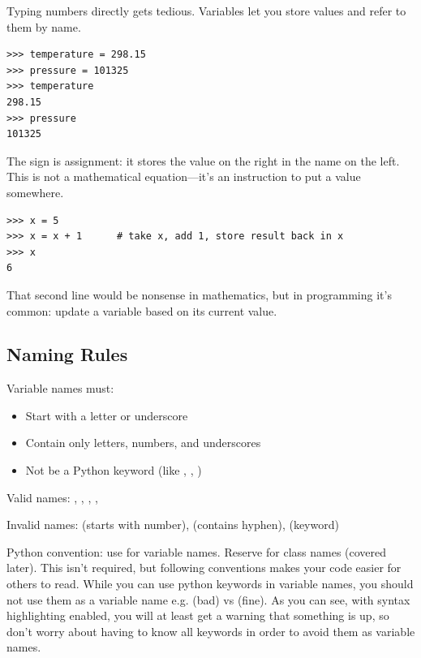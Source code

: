 Typing numbers directly gets tedious. Variables let you store values and refer to them by name.

\begin{lstlisting}
>>> temperature = 298.15
>>> pressure = 101325
>>> temperature
298.15
>>> pressure
101325
\end{lstlisting}

The \py{=} sign is assignment: it stores the value on the right in the name on the left. This is not a mathematical equation---it's an instruction to put a value somewhere.

\begin{lstlisting}
>>> x = 5
>>> x = x + 1      # take x, add 1, store result back in x
>>> x
6
\end{lstlisting}

That second line would be nonsense in mathematics, but in programming it's common: update a variable based on its current value.

\subsection{Naming Rules}

Variable names must:
\begin{itemize}
    \item Start with a letter or underscore
    \item Contain only letters, numbers, and underscores
    \item Not be a Python keyword (like , , )
\end{itemize}

Valid names: , , , , 

Invalid names:  (starts with number),  (contains hyphen),  (keyword)

\begin{tip}
Python convention: use  for variable names. Reserve  for class names (covered later). This isn't required, but following conventions makes your code easier for others to read. While you can use python keywords in variable names, you should not use them as a variable name e.g.  (bad) vs  (fine). As you can see, with syntax highlighting enabled, you will at least get a warning that something is up, so don't worry about having to know all keywords in order to avoid them as variable names.
\end{tip}

